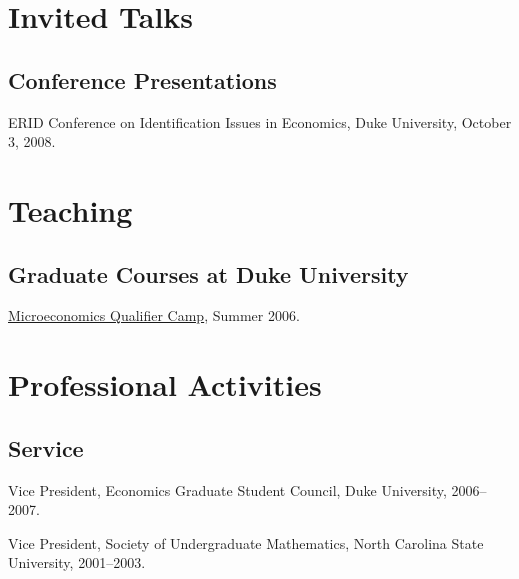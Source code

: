 \documentclass[letterpaper]{article}
\renewenvironment{itemize}{
  \begin{list}{}{
    \setlength{\leftmargin}{1em}
  }
}{
  \end{list}
}
\begin{document}
\section*{Invited Talks}

\subsection*{Conference Presentations}

\begin{itemize}
\item ERID Conference on Identification Issues in Economics,
  Duke University,
  October 3, 2008.
\end{itemize}



\section*{Teaching}

\subsection*{Graduate Courses at Duke University}

\begin{itemize}
\item \href{http://jblevins.org/courses/qualcamp06}{Microeconomics
    Qualifier Camp}, Summer 2006.
\end{itemize}


\section*{Professional Activities}

\subsection*{Service}

\begin{itemize}
\item Vice President, Economics Graduate Student Council, Duke University,
  2006--2007.
\item Vice President, Society of Undergraduate Mathematics, North
  Carolina State University, 2001--2003.
\end{itemize}
\end{document}
